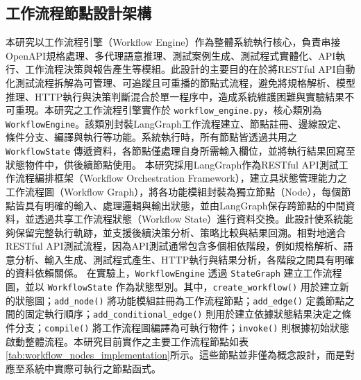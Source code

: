 \begin{ZhChapter}
\subsection{工作流程節點設計架構}
\text 本研究以工作流程引擎（Workflow Engine）作為整體系統執行核心，負責串接OpenAPI規格處理、多代理語意推理、測試案例生成、測試程式實體化、API執行、工作流程決策與報告產生等模組。此設計的主要目的在於將RESTful API自動化測試流程拆解為可管理、可追蹤且可重播的節點式流程，避免將規格解析、模型推理、HTTP執行與決策判斷混合於單一程序中，造成系統維護困難與實驗結果不可重現。本研究之工作流程引擎實作於 \texttt{workflow\_engine.py}，核心類別為 \texttt{WorkflowEngine}。該類別封裝LangGraph工作流程建立、節點註冊、邊線設定、條件分支、編譯與執行等功能。系統執行時，所有節點皆透過共用之 \texttt{WorkflowState} 傳遞資料，各節點僅處理自身所需輸入欄位，並將執行結果回寫至狀態物件中，供後續節點使用。
\text 本研究採用LangGraph作為RESTful API測試工作流程編排框架（Workflow Orchestration Framework），建立具狀態管理能力之工作流程圖（Workflow Graph），將各功能模組封裝為獨立節點（Node），每個節點皆具有明確的輸入、處理邏輯與輸出狀態，並由LangGraph保存跨節點的中間資料，並透過共享工作流程狀態（Workflow State）進行資料交換。此設計使系統能夠保留完整執行軌跡，並支援後續決策分析、策略比較與結果回溯。相對地適合RESTful API測試流程，因為API測試通常包含多個相依階段，例如規格解析、語意分析、輸入生成、測試程式產生、HTTP執行與結果分析，各階段之間具有明確的資料依賴關係。
\text 在實驗上，\texttt{WorkflowEngine} 透過 \texttt{StateGraph} 建立工作流程圖，並以 \texttt{WorkflowState} 作為狀態型別。其中，\texttt{create\_workflow()} 用於建立新的狀態圖；\texttt{add\_node()} 將功能模組註冊為工作流程節點；\texttt{add\_edge()} 定義節點之間的固定執行順序；\texttt{add\_conditional\_edge()} 則用於建立依據狀態結果決定之條件分支；\texttt{compile()} 將工作流程圖編譯為可執行物件；\texttt{invoke()} 則根據初始狀態啟動整體流程。本研究目前實作之主要工作流程節點如表\ref{tab:workflow_nodes_implementation}所示。這些節點並非僅為概念設計，而是對應至系統中實際可執行之節點函式。


\end{ZhChapter}
